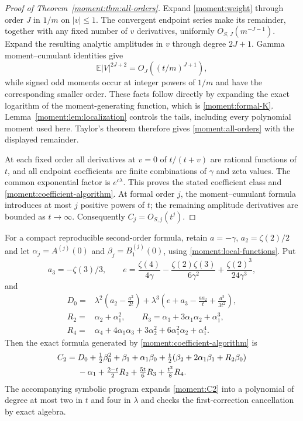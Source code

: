 \begin{proof}[Proof of Theorem~\ref{moment:thm:all-orders}]
Expand \eqref{moment:weight} through order $J$ in $1/m$ on $|v|\le1$.
The convergent endpoint series make its remainder, together with any
fixed number of $v$ derivatives, uniformly $O_{S,J}(m^{-J-1})$.
Expand the resulting analytic amplitudes in $v$ through degree $2J+1$.
Gamma moment--cumulant identities give
\[
 \mathbb E|V|^{2J+2}=O_J\!\left((t/m)^{J+1}\right),
\]
while signed odd moments occur at integer powers of $1/m$ and have the
corresponding smaller order. These facts follow directly by expanding
the exact logarithm of the moment-generating function, which is
\eqref{moment:formal-K}. Lemma~\ref{moment:lem:localization} controls
the tails, including every polynomial moment used here.
Taylor's theorem therefore gives \eqref{moment:all-orders} with the
displayed remainder.

At each fixed order all derivatives at $v=0$ of
$t/(t+v)$ are rational functions of $t$, and all endpoint coefficients
are finite combinations of $\gamma$ and zeta values. The common
exponential factor is $e^{c\lambda}$. This proves the stated coefficient
class and \eqref{moment:coefficient-algorithm}. At formal order $j$, the
moment--cumulant formula introduces at most $j$ positive powers of $t$;
the remaining amplitude derivatives are bounded as $t\to\infty$.
Consequently $C_j=O_{S,j}(t^j)$.
\end{proof}

For a compact reproducible second-order formula, retain $a=-\gamma$,
$a_2=\zeta(2)/2$ and let
$\alpha_j=A^{(j)}(0)$ and $\beta_j=B_1^{(j)}(0)$, using
\eqref{moment:local-functions}. Put
\[
 a_3=-\zeta(3)/3,\qquad
 e=\frac{\zeta(4)}{4\gamma}
       -\frac{\zeta(2)\zeta(3)}{6\gamma^2}
       +\frac{\zeta(2)^3}{24\gamma^3},
\]
and
\begin{align*}
 D_0={}&\lambda^2\left(a_2-\frac{a^2}{2t}\right)
       +\lambda^3\left(e+a_3-\frac{aa_2}{t}
                               +\frac{a^3}{3t^2}\right),\\
 R_2={}&\alpha_2+\alpha_1^2,\qquad
 R_3=\alpha_3+3\alpha_1\alpha_2+\alpha_1^3,\\
 R_4={}&\alpha_4+4\alpha_1\alpha_3+3\alpha_2^2+6\alpha_1^2\alpha_2+\alpha_1^4.
\end{align*}
Then the exact formula generated by \eqref{moment:coefficient-algorithm} is
\begin{align}\label{moment:C2}
 C_2={}&D_0+\tfrac12 \beta_0^2+\beta_1+\alpha_1\beta_0
       +\tfrac t2(\beta_2+2\alpha_1\beta_1+R_2\beta_0)\notag\\
       &-\alpha_1+\tfrac{2-t}{2}R_2+\tfrac{5t}{6}R_3+\tfrac{t^2}{8}R_4.
\end{align}
The accompanying symbolic program expands \eqref{moment:C2} into a
polynomial of degree at most two in $t$ and four in $\lambda$ and checks
the first-correction cancellation by exact algebra.

